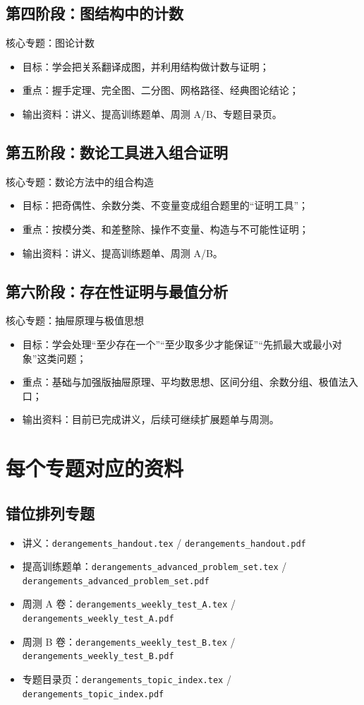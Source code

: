 \documentclass[11pt,a4paper,fontset=fandol]{ctexart}
\begin{document}
\subsection{第四阶段：图结构中的计数}
核心专题：图论计数
\begin{itemize}
  \item 目标：学会把关系翻译成图，并利用结构做计数与证明；
  \item 重点：握手定理、完全图、二分图、网格路径、经典图论结论；
  \item 输出资料：讲义、提高训练题单、周测 A/B、专题目录页。
\end{itemize}

\subsection{第五阶段：数论工具进入组合证明}
核心专题：数论方法中的组合构造
\begin{itemize}
  \item 目标：把奇偶性、余数分类、不变量变成组合题里的“证明工具”；
  \item 重点：按模分类、和差整除、操作不变量、构造与不可能性证明；
  \item 输出资料：讲义、提高训练题单、周测 A/B。
\end{itemize}

\subsection{第六阶段：存在性证明与最值分析}
核心专题：抽屉原理与极值思想
\begin{itemize}
  \item 目标：学会处理“至少存在一个”“至少取多少才能保证”“先抓最大或最小对象”这类问题；
  \item 重点：基础与加强版抽屉原理、平均数思想、区间分组、余数分组、极值法入口；
  \item 输出资料：目前已完成讲义，后续可继续扩展题单与周测。
\end{itemize}

\section{每个专题对应的资料}

\subsection{错位排列专题}
\begin{itemize}
  \item 讲义：\texttt{derangements\_handout.tex} / \texttt{derangements\_handout.pdf}
  \item 提高训练题单：\texttt{derangements\_advanced\_problem\_set.tex} / \texttt{derangements\_advanced\_problem\_set.pdf}
  \item 周测 A 卷：\texttt{derangements\_weekly\_test\_A.tex} / \texttt{derangements\_weekly\_test\_A.pdf}
  \item 周测 B 卷：\texttt{derangements\_weekly\_test\_B.tex} / \texttt{derangements\_weekly\_test\_B.pdf}
  \item 专题目录页：\texttt{derangements\_topic\_index.tex} / \texttt{derangements\_topic\_index.pdf}
\end{itemize}
\end{document}
